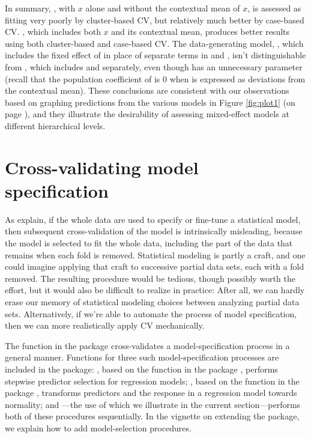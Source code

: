 \documentclass[
]{jss}
\begin{document}
In summary, , with \(x\) alone and without the contextual
mean of \(x\), is assessed as fitting very poorly by cluster-based CV,
but relatively much better by case-based CV. , which
includes both \(x\) and its contextual mean, produces better results
using both cluster-based and case-based CV. The data-generating model,
, which includes the fixed effect of  in place
of separate terms in  and , isn't distinguishable from
, which includes  and  separately, even
though  has an unnecessary parameter (recall that the
population coefficient of  is 0 when  is expressed as
deviations from the contextual mean). These conclusions are consistent
with our observations based on graphing predictions from the various
models in Figure \ref{fig:plot1} (on page \pageref{fig:plot1}), and they
illustrate the desirability of assessing mixed-effect models at
different hierarchical levels.

\hypertarget{cross-validating-model-specification}{%
\section{Cross-validating model
specification}\label{cross-validating-model-specification}}

As \citet[Sec. 7.10.2: ``The Wrong and Right Way to Do
Cross-validation'']{HastieTibshiraniFriedman:2009} explain, if the whole
data are used to specify or fine-tune a statistical model, then
subsequent cross-validation of the model is intrinsically misleading,
because the model is selected to fit the whole data, including the part
of the data that remains when each fold is removed. Statistical modeling
is partly a craft, and one could imagine applying that craft to
successive partial data sets, each with a fold removed. The resulting
procedure would be tedious, though possibly worth the effort, but it
would also be difficult to realize in practice: After all, we can hardly
erase our memory of statistical modeling choices between analyzing
partial data sets. Alternatively, if we're able to automate the process
of model specification, then we can more realistically apply CV
mechanically.

The  function in the  package cross-validates a
model-specification process in a general manner. Functions for three
such model-specification processes are included in the package:
, based on the  function in the
 package \citep{VenablesRipley:2002}, performs stepwise
predictor selection for regression models; , based
on the  function in the  package
\citep{FoxWeisberg:2019}, transforms predictors and the response in a
regression model towards normality; and
---the use of which we illustrate in the
current section---performs both of these procedures sequentially. In the
vignette on extending the  package, we explain how to add
model-selection procedures.
\end{document}
